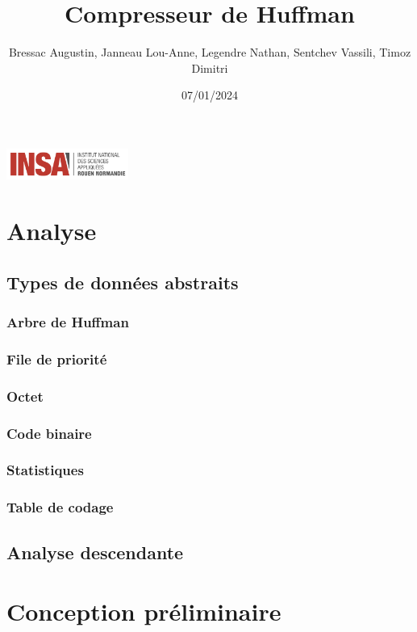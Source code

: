 \documentclass[12pt,a4paper]{article}
\title{Compresseur de Huffman}
\author{Bressac Augustin, Janneau Lou-Anne, Legendre Nathan, Sentchev Vassili, Timoz Dimitri}
\date{07/01/2024}
\begin{document}
\includegraphics[width=0.3\textwidth]{Logo_INSA_RN.jpg}
\maketitle

\tableofcontents

\section{Analyse}
\subsection{Types de données abstraits}
\subsubsection{Arbre de Huffman}

\subsubsection{File de priorité}

\subsubsection{Octet}

\subsubsection{Code binaire}

\subsubsection{Statistiques}

\subsubsection{Table de codage}

\subsection{Analyse descendante}
%

\section{Conception préliminaire}
\end{document}
